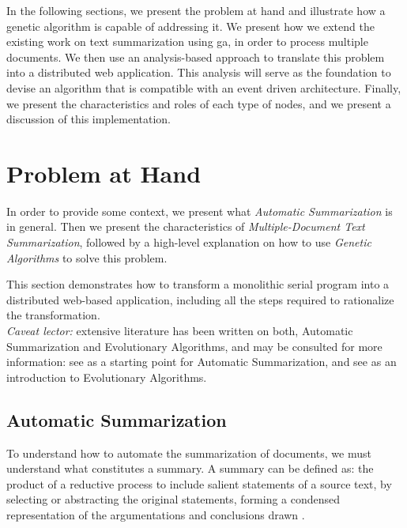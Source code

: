 \documentclass[12pt, titlepage]{uo_temp}
\begin{document}
     In the following sections, we present the problem at hand and illustrate how a
     genetic algorithm is capable of addressing it. We present how we extend the existing
     work on text summarization using \gls{ga}, in order to process multiple
     documents. We then use an analysis-based approach to translate this problem
     into a distributed web application. This analysis will serve as the foundation to devise
     an algorithm that is compatible with an event driven architecture. Finally, we
     present the characteristics and roles of each type of nodes, and we present a
     discussion of this implementation.

     \section{Problem at Hand}

     In order to provide some context, we present what \emph{Automatic Summarization} is
     in general. Then we present the characteristics of \emph{Multiple-Document Text
       Summarization}, followed by a high-level explanation on how to use \emph{Genetic
       Algorithms} to solve this problem.
     
     This section demonstrates how to transform a monolithic serial program into a
     distributed web-based application, including all the steps required to rationalize
     the transformation. \\

     \emph{Caveat lector:} extensive literature has
     been written on both, Automatic Summarization and Evolutionary Algorithms, and may
     be consulted for more information: see \cite{mani1999advances} as a starting point
     for Automatic Summarization, and see \cite{eiben2008introduction} as an introduction
     to Evolutionary Algorithms.

     \subsection{Automatic Summarization}
     To understand how to automate the summarization of documents, we must understand
     what constitutes a summary. A summary can be defined as: the product of a reductive process
     to include salient statements of a source text, by selecting or abstracting the
     original statements, forming a condensed representation of the argumentations and
     conclusions drawn \cite{jones1999automatic}.
\end{document}
